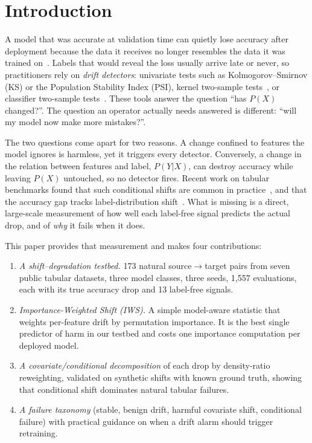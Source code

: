 \documentclass[conference]{IEEEtran}
\theoremstyle{plainhead}
\newcommand{\iws}{\textsc{IWS}}
\begin{document}
\par\vspace{4pt}\par

\section{Introduction}
A model that was accurate at validation time can quietly lose accuracy after deployment because the data it receives no longer resembles the data it was trained on~\cite{quinonero2009dataset,moreno2012unifying}. Labels that would reveal the loss usually arrive late or never, so practitioners rely on \emph{drift detectors}: univariate tests such as Kolmogorov--Smirnov (KS) or the Population Stability Index (PSI), kernel two-sample tests~\cite{gretton2012kernel}, or classifier two-sample tests~\cite{lopezpaz2017c2st,rabanser2019failing}. These tools answer the question ``has $P(X)$ changed?''. The question an operator actually needs answered is different: ``will my model now make more mistakes?''.

The two questions come apart for two reasons. A change confined to features the model ignores is harmless, yet it triggers every detector. Conversely, a change in the relation between features and label, $P(Y|X)$, can destroy accuracy while leaving $P(X)$ untouched, so no detector fires. Recent work on tabular benchmarks found that such conditional shifts are common in practice~\cite{liu2023need}, and that the accuracy gap tracks label-distribution shift~\cite{gardner2023tableshift}. What is missing is a direct, large-scale measurement of how well each label-free signal predicts the actual drop, and of \emph{why} it fails when it does.

This paper provides that measurement and makes four contributions:
\begin{enumerate}
  \item \textit{A shift--degradation testbed.} 173 natural source$\to$target pairs from seven public tabular datasets, three model classes, three seeds, 1{,}557 evaluations, each with its true accuracy drop and 13 label-free signals.
  \item \textit{Importance-Weighted Shift (\iws{}).} A simple model-aware statistic that weights per-feature drift by permutation importance. It is the best single predictor of harm in our testbed and costs one importance computation per deployed model.
  \item \textit{A covariate/conditional decomposition} of each drop by density-ratio reweighting, validated on synthetic shifts with known ground truth, showing that conditional shift dominates natural tabular failures.
  \item \textit{A failure taxonomy} (stable, benign drift, harmful covariate shift, conditional failure) with practical guidance on when a drift alarm should trigger retraining.
\end{enumerate}
\end{document}
